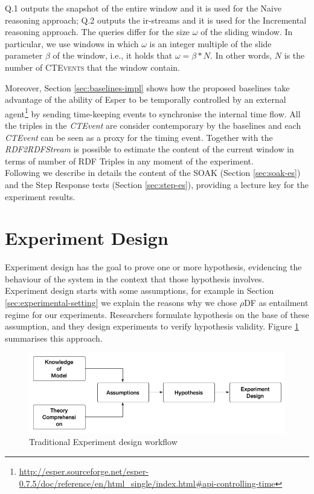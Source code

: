 Q.1 outputs the snapshot of the entire window and it is used for the Naive reasoning approach; Q.2 outputs the ir-streams and it is used for the Incremental reasoning approach. The queries differ for the size $\omega$ of the sliding window. In particular, we use windows in which $\omega$ is an integer multiple of the slide parameter $\beta$ of the window, i.e., it holds that $\omega = \beta * N$. In other words, $N$ is the number of \textsc{CTEvents} that the window contain. 

Moreover, Section \ref{sec:baselines-impl} shows how the proposed baselines take advantage of the ability of Esper to be temporally controlled by an external agent\footnote{\url{http://esper.sourceforge.net/esper-0.7.5/doc/reference/en/html_single/index.html#api-controlling-time}} by sending time-keeping events to synchronise the internal time flow. All the triples in the \textit{CTEvent} are consider contemporary by the baselines and each \textit{CTEvent} can be seen as a proxy for the timing event. Together with the \textit{RDF2RDFStream} is possible to estimate the content of the current window in terms of number of RDF Triples in any moment of the experiment.\\

Following we describe in details the content of the SOAK (Section \ref{sec:soak-es}) and the Step Response tests (Section \ref{sec:step-es}), providing a lecture key for the experiment results.

\section{Experiment Design}

Experiment design has the goal to prove one or more hypothesis, evidencing the behaviour of the system in the context that those hypothesis involves. Experiment design starts with some assumptions, for example in Section \ref{sec:experimental-setting} we explain the reasons why we chose $\rho$DF as entailment regime for our experiments. Researchers formulate hypothesis on the base of these assumption, and they design experiments to verify hypothesis validity. Figure \ref{fig:experiment-design} summarises this approach.

\begin{figure}[tbh]
  \centering
	\includegraphics[width=\linewidth]{images/experiment-design}
	\caption{Traditional Experiment design workflow} 
  	\label{fig:experiment-design}
\end{figure}


